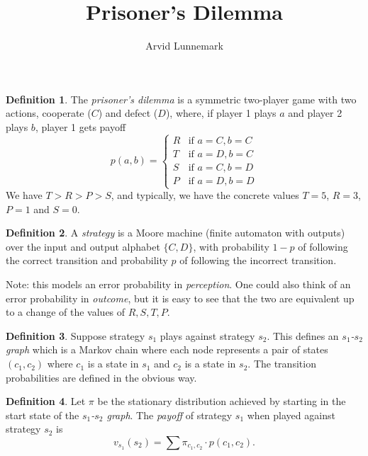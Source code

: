 \documentclass[11pt]{amsart}
\title{Prisoner's Dilemma}
\author{Arvid Lunnemark}
\theoremstyle{definition}
\newtheorem{definition}{Definition}
\theoremstyle{remark}
\begin{document}
\maketitle

\begin{definition}
  The \textit{prisoner's dilemma} is a symmetric two-player game with two actions, cooperate ($C$) and defect ($D$), where, if player 1 plays $a$ and player 2 plays $b$, player 1 gets payoff 
  \begin{equation*}
    p(a,b) = \begin{cases}
      R &\text{if $a = C, b = C$} \\
      T &\text{if $a = D, b = C$} \\
      S &\text{if $a = C, b = D$} \\
      P &\text{if $a = D, b = D$}
    \end{cases}
  \end{equation*}
  We have $T > R > P > S$, and typically, we have the concrete values $T = 5$, $R = 3$, $P = 1$ and $S = 0$.
\end{definition}

\begin{definition}
  A \textit{strategy} is a Moore machine (finite automaton with outputs) over the input and output alphabet $\{C, D\}$, with probability $1-p$ of following the correct transition and probability $p$ of following the incorrect transition.
\end{definition}

Note: this models an error probability in \textit{perception}. One could also think of an error probability in \textit{outcome}, but it is easy to see that the two are equivalent up to a change of the values of $R, S, T, P$.

\begin{definition}
  Suppose strategy $s_1$ plays against strategy $s_2$. This defines an \textit{$s_1$-$s_2$ graph} which is a Markov chain where each node represents a pair of states $(c_1,c_2)$ where $c_1$ is a state in $s_1$ and $c_2$ is a state in $s_2$. The transition probabilities are defined in the obvious way.
\end{definition}

\begin{definition}
  Let $\pi$ be the stationary distribution achieved by starting in the start state of the \textit{$s_1$-$s_2$ graph}. The \textit{payoff} of strategy $s_1$ when played against strategy $s_2$ is \begin{equation*}
    v_{s_1}(s_2) = \sum \pi_{c_1, c_2} \cdot p(c_1, c_2).
  \end{equation*}
\end{definition}
\end{document}
